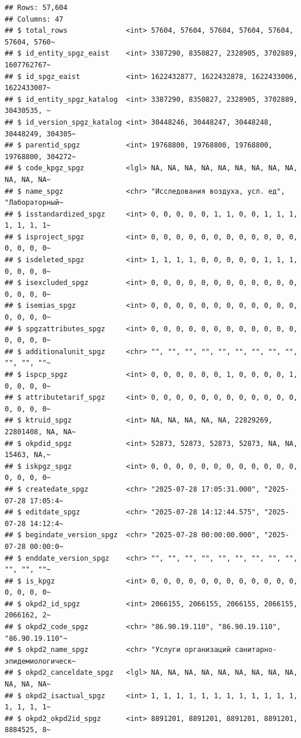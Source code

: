 \documentclass[
]{article}
\begin{document}
\begin{verbatim}
## Rows: 57,604
## Columns: 47
## $ total_rows              <int> 57604, 57604, 57604, 57604, 57604, 57604, 5760~
## $ id_entity_spgz_eaist    <int> 3387290, 8350827, 2328905, 3702889, 1607762767~
## $ id_spgz_eaist           <int> 1622432877, 1622432878, 1622433006, 1622433007~
## $ id_entity_spgz_katalog  <int> 3387290, 8350827, 2328905, 3702889, 30430535, ~
## $ id_version_spgz_katalog <int> 30448246, 30448247, 30448248, 30448249, 304305~
## $ parentid_spgz           <int> 19768800, 19768800, 19768800, 19768800, 304272~
## $ code_kpgz_spgz          <lgl> NA, NA, NA, NA, NA, NA, NA, NA, NA, NA, NA, NA~
## $ name_spgz               <chr> "Исследования воздуха, усл. ед", "Лабораторный~
## $ isstandardized_spgz     <int> 0, 0, 0, 0, 0, 1, 1, 0, 0, 1, 1, 1, 1, 1, 1, 1~
## $ isproject_spgz          <int> 0, 0, 0, 0, 0, 0, 0, 0, 0, 0, 0, 0, 0, 0, 0, 0~
## $ isdeleted_spgz          <int> 1, 1, 1, 1, 0, 0, 0, 0, 0, 1, 1, 1, 0, 0, 0, 0~
## $ isexcluded_spgz         <int> 0, 0, 0, 0, 0, 0, 0, 0, 0, 0, 0, 0, 0, 0, 0, 0~
## $ isemias_spgz            <int> 0, 0, 0, 0, 0, 0, 0, 0, 0, 0, 0, 0, 0, 0, 0, 0~
## $ spgzattributes_spgz     <int> 0, 0, 0, 0, 0, 0, 0, 0, 0, 0, 0, 0, 0, 0, 0, 0~
## $ additionalunit_spgz     <chr> "", "", "", "", "", "", "", "", "", "", "", ""~
## $ ispcp_spgz              <int> 0, 0, 0, 0, 0, 0, 1, 0, 0, 0, 0, 1, 0, 0, 0, 0~
## $ attributetarif_spgz     <int> 0, 0, 0, 0, 0, 0, 0, 0, 0, 0, 0, 0, 0, 0, 0, 0~
## $ ktruid_spgz             <int> NA, NA, NA, NA, NA, 22829269, 22801408, NA, NA~
## $ okpdid_spgz             <int> 52873, 52873, 52873, 52873, NA, NA, 15463, NA,~
## $ iskpgz_spgz             <int> 0, 0, 0, 0, 0, 0, 0, 0, 0, 0, 0, 0, 0, 0, 0, 0~
## $ createdate_spgz         <chr> "2025-07-28 17:05:31.000", "2025-07-28 17:05:4~
## $ editdate_spgz           <chr> "2025-07-28 14:12:44.575", "2025-07-28 14:12:4~
## $ begindate_version_spgz  <chr> "2025-07-28 00:00:00.000", "2025-07-28 00:00:0~
## $ enddate_version_spgz    <chr> "", "", "", "", "", "", "", "", "", "", "", ""~
## $ is_kpgz                 <int> 0, 0, 0, 0, 0, 0, 0, 0, 0, 0, 0, 0, 0, 0, 0, 0~
## $ okpd2_id_spgz           <int> 2066155, 2066155, 2066155, 2066155, 2066162, 2~
## $ okpd2_code_spgz         <chr> "86.90.19.110", "86.90.19.110", "86.90.19.110"~
## $ okpd2_name_spgz         <chr> "Услуги организаций санитарно-эпидемиологическ~
## $ okpd2_canceldate_spgz   <lgl> NA, NA, NA, NA, NA, NA, NA, NA, NA, NA, NA, NA~
## $ okpd2_isactual_spgz     <int> 1, 1, 1, 1, 1, 1, 1, 1, 1, 1, 1, 1, 1, 1, 1, 1~
## $ okpd2_okpd2id_spgz      <int> 8891201, 8891201, 8891201, 8891201, 8884525, 8~

\end{verbatim}
\end{document}
